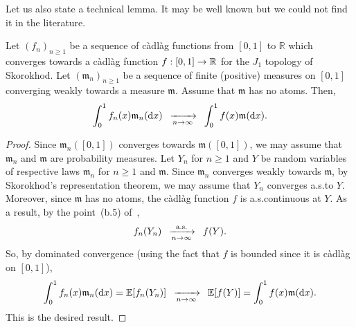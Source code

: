 \documentclass[AHL,Unicode,published]{cedram}
\newcommand{\cv}[1][n]{\enskip\xrightarrow[#1 \to \infty]{}\enskip}
\newcommand{\cvps}[1][n]{\enskip\xrightarrow[#1 \to \infty]{\text{a.s.}}\enskip}
\newcommand{\rmd}{\mathrm{d}}
\newcommand{\R}{\mathbb{R}}
\newcommand{\E}{\mathbb{E}}
\newcommand{\1}{\mathbbm{1}}
\newcommand{\fkm}{\mathfrak{m}}
\let\originalleft\left
\let\originalright\right
\renewcommand{\left}{\mathopen{}\mathclose\bgroup\originalleft}
\renewcommand{\right}{\aftergroup\egroup\originalright}
\renewcommand*{\to}{\mathchoice{\longrightarrow}{\rightarrow}{\rightarrow}{\rightarrow}}
\begin{document}
Let us also state a technical lemma. It may be well known but we could not find it in the literature.

\begin{lemm}\label{lemme technique cv skorokhod}
Let $(f_n)_{n\ge 1}$ be a sequence of càdlàg functions from $[0,1]$ to $\R$ which converges towards a càdlàg function $f:[0,1]\to \R$ for the $J_1$ topology of Skorokhod. Let $(\fkm_n)_{n\ge 1}$ be a sequence of finite (positive) measures on $[0,1]$ converging weakly towards a measure $\fkm$. Assume that $\fkm$ has no atoms. Then,
\[
\int_0^1 f_n(x) \fkm_n(\rmd x) \cv \int_0^1 f(x) \fkm(\rmd x).
\]
\end{lemm}
\begin{proof}
Since $\fkm_n([0,1])$ converges towards $\fkm([0,1])$, we may assume that $\fkm_n$ and $\fkm$ are probability measures. Let $Y_n$ for $n\ge 1$ and $Y$ be random variables of respective laws $\fkm_n$ for $n\ge 1$ and $\fkm$. Since $\fkm_n$ converges weakly towards $\fkm$, by Skorokhod's representation theorem, we may assume that $Y_n$ converges a.s.\@ to $Y$. Moreover, since $\fkm$ has no atoms, the càdlàg function $f$ is a.s.\@ continuous at $Y$. As a result, by the point~(b.5) of~\cite[Proposition~2.1 in Chapter~VI]{JS03},
\[
f_n(Y_n) \cvps f(Y).
\]
So, by dominated convergence (using the fact that $f$ is bounded since it is càdlàg on $[0,1]$),
\[
\int_0^1 f_n(x) \fkm_n (\rmd x) = \E\left[f_n(Y_n)\right] \cv
\E\left[f(Y)\right]= \int_0^1 f(x) \fkm(\rmd x).
\]
This is the desired result.
\end{proof}
\end{document}
